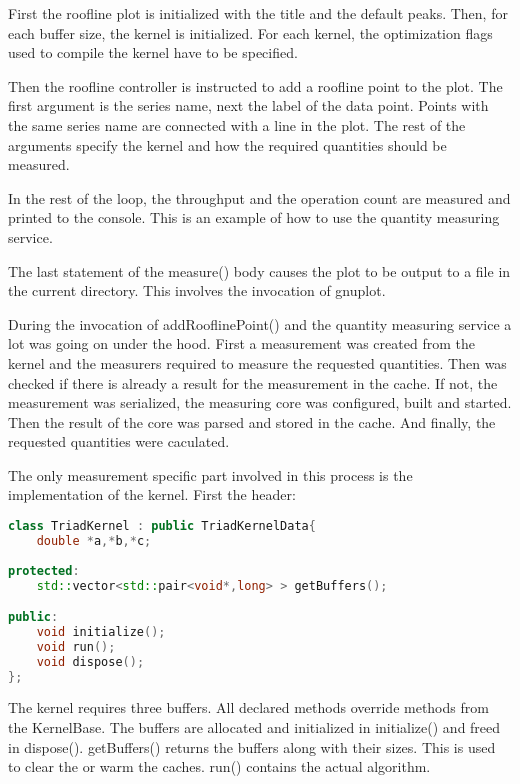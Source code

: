 \documentclass[a4paper,12pt]{article}
\begin{document}
First the roofline plot is initialized with the title and the default peaks.
Then, for each buffer size, the kernel is initialized. For each kernel, the
optimization flags used to compile the kernel have to be specified.

Then the roofline controller is instructed to add a roofline point to the plot.
The first argument is the series name, next the label of the data point. Points
with the same series name are connected with a line in the plot. The rest of the
arguments specify the kernel and how the required quantities should be measured.

In the rest of the loop, the throughput and the operation count are measured and
printed to the console. This is an example of how to use the quantity measuring
service.

The last statement of the measure() body causes the plot to be output to a file
in the current directory. This involves the invocation of gnuplot.

During the invocation of addRooflinePoint() and the quantity measuring service a
lot was going on under the hood. First a measurement was created from the
kernel and the measurers required to measure the requested quantities. Then was
checked if there is already a result for the measurement in the cache. If not,
the measurement was serialized, the measuring core was configured, built
and started. Then the result of the core was parsed and stored in the cache.
And finally, the requested quantities were caculated.

The only measurement specific part involved in this process is the
implementation of the kernel. First the header:

\begin{lstlisting}[language=C++]
class TriadKernel : public TriadKernelData{
	double *a,*b,*c;
	
protected:
	std::vector<std::pair<void*,long> > getBuffers();

public:
	void initialize();
	void run();
	void dispose();
};
\end{lstlisting}

The kernel requires three buffers. All declared methods override methods
from the KernelBase. The buffers are allocated and initialized in
initialize() and freed in dispose(). getBuffers() returns the buffers along with
their sizes. This is used to clear the or warm the caches. run() contains the
actual algorithm. 
\end{document}
